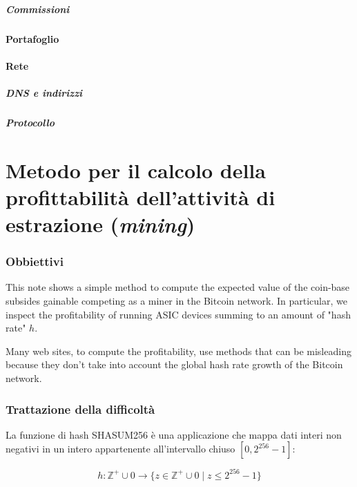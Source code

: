 \documentclass{article}
\begin{document}
\subsubsection{Commissioni}

\subsection{Portafoglio}

\subsection{Rete}
\subsubsection{DNS e indirizzi}
\subsubsection{Protocollo}

\newpage
\part{Metodo per il calcolo della profittabilità dell'attività di estrazione (\textit{mining})}

\section{Obbiettivi}

This note shows a simple method to compute the expected value of the coin-base subsides gainable competing as a miner in the Bitcoin network.
In particular, we inspect the profitability of running ASIC devices summing to an amount of "hash rate" $h$.

Many web sites, to compute the profitability, use methods that can be misleading because they don't take into account the global hash rate growth of the Bitcoin network.

\section{Trattazione della difficoltà}

La funzione di hash SHASUM256 è una applicazione che mappa dati interi non negativi in un intero appartenente all'intervallo chiuso $ \left [0, 2^{256} - 1 \right ]$:

\begin{equation}
    h: \mathbb{Z}^{+} \cup {0} \rightarrow \{ z \in \mathbb{Z}^{+} \cup {0} \mid z  \leq 2^{256} - 1 \} \label{applicazione_hash}
\end{equation}
\end{document}
